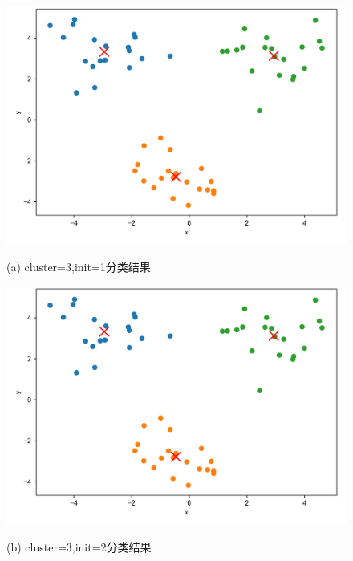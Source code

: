 \documentclass{article}
\begin{document}
\begin{figure}[htbp]
	\begin{minipage}{0.48\linewidth}
		\centerline{\includegraphics[width=0.7\linewidth]{img//fig1.png}}
		\centerline{(a) cluster=3,init=1分类结果}
	\end{minipage}
	\begin{minipage}{.48\linewidth}
		\centerline{\includegraphics[width=0.7\linewidth]{img//fig2.png}}
		\centerline{(b)  cluster=3,init=2分类结果}
	\end{minipage}


\end{figure}
\end{document}
